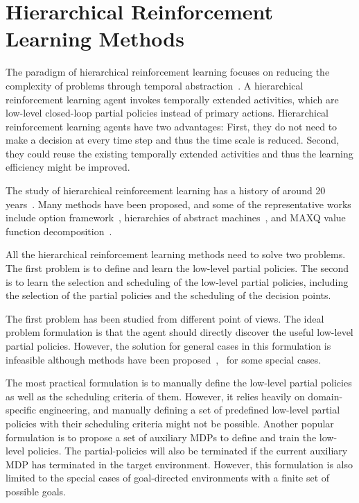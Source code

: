 \section{Hierarchical Reinforcement Learning Methods}


The paradigm of hierarchical reinforcement learning focuses on reducing the complexity of problems through temporal abstraction~\cite{barto2003recent}. A hierarchical reinforcement learning agent invokes temporally extended activities, which are low-level closed-loop partial policies instead of primary actions. Hierarchical reinforcement learning agents have two advantages: First, they do not need to make a decision at every time step and thus the time scale is reduced. Second, they could reuse the existing temporally extended activities and thus the learning efficiency might be improved.

The study of hierarchical reinforcement learning has a history of around 20 years~\cite{sutton1999between}. Many methods have been proposed,  and some of the representative works include option framework~\cite{sutton1999between}, hierarchies of abstract machines~\cite{parr1998reinforcement}, and MAXQ value function decomposition~\cite{dietterich2000hierarchical}.

All the hierarchical reinforcement learning methods need to solve two problems. The first problem is to define and learn the low-level partial policies. The second is to learn the selection and scheduling of the low-level partial policies, including the selection of the partial policies and the scheduling of the decision points.

The first problem has been studied from different point of views. The ideal problem formulation is that the agent should directly discover the useful low-level partial policies. However, the solution for general cases in this formulation is infeasible although methods have been proposed~\cite{mcgovern2001automatic},~\cite{hengst2002discovering} for some special cases. 

The most practical formulation is to manually define the low-level partial policies as well as the scheduling criteria of them. However, it relies heavily on domain-specific engineering, and manually defining a set of predefined low-level partial policies with their scheduling criteria might not be possible. Another popular formulation is to propose a set of auxiliary MDPs to define and train the low-level policies. The partial-policies will also be terminated if the current auxiliary MDP has terminated in the target environment. However, this formulation is also limited to the special cases of goal-directed environments with a finite set of possible goals. 

